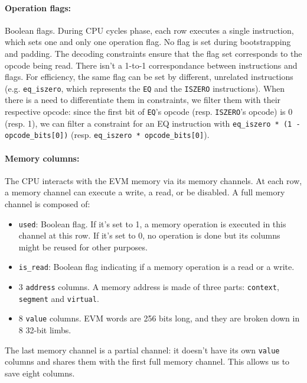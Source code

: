 \paragraph*{Operation flags:} Boolean flags. During CPU cycles phase, each row executes a single instruction, which sets one and only one operation flag. No flag is set during
bootstrapping and padding. The decoding constraints ensure that the flag set corresponds to the opcode being read.
There isn't a 1-to-1 correspondance between instructions and flags. For efficiency, the same flag can be set by different, unrelated instructions (e.g. \texttt{eq\_iszero}, which represents
the \texttt{EQ} and the \texttt{ISZERO} instructions). When there is a need to differentiate them in constraints, we filter them with their respective opcode: since the first bit of \texttt{EQ}'s opcode
(resp. \texttt{ISZERO}'s opcode) is 0 (resp. 1), we can filter a constraint for an EQ instruction with \texttt{eq\_iszero * (1 - opcode\_bits[0])}
(resp. \texttt{eq\_iszero * opcode\_bits[0]}).

\paragraph*{Memory columns:} The CPU interacts with the EVM memory via its memory channels. At each row, a memory channel can execute a write, a read, or be disabled. A full memory channel is composed of:
\begin{itemize}
    \item  \texttt{used}: Boolean flag. If it's set to 1, a memory operation is executed in this channel at this row. If it's set to 0, no operation is done but its columns might be reused for other purposes.
    \item  \texttt{is\_read}: Boolean flag indicating if a memory operation is a read or a write.
    \item  3 \texttt{address} columns. A memory address is made of three parts: \texttt{context}, \texttt{segment} and \texttt{virtual}.
    \item  8 \texttt{value} columns. EVM words are 256 bits long, and they are broken down in 8 32-bit limbs.
\end{itemize}
The last memory channel is a partial channel: it doesn't have its own \texttt{value} columns and shares them with the first full memory channel. This allows us to save eight columns.

